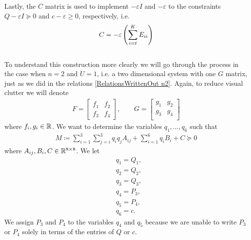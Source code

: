 \documentclass[a4paper,12pt,twoside,BCOR=10mm]{scrbook}
\begin{document}
Lastly, the $C$ matrix is used to implement $-\varepsilon I$ and $-\varepsilon$ to the constraints $Q - \varepsilon I \succeq 0$ and $c - \varepsilon \geq 0$, respectively, i.e.
\begin{align*}
    C = -\varepsilon\left(\sum_{i = t}^K E_{ii}\right)
\end{align*}
\\
To understand this construction more clearly we will go through the process in the case when $n = 2$ and $U = 1$, i.e. a two dimensional system with one $G$ matrix, just as we did in the relations \eqref{RelationsWrittenOut n2}. Again, to reduce visual clutter we will denote
\begin{align*}
    F = \begin{bmatrix}
    f_1 & f_2\\
    f_3 & f_4
    \end{bmatrix}
    , \qquad
    G = \begin{bmatrix}
    g_1 & g_2\\
    g_3 & g_4\\
    \end{bmatrix}
\end{align*}
where $f_i,g_i \in \mathbb{R}^{}$. We want to determine the variables $q_1, \ldots, q_6$ such that
\begin{align}
    M \coloneqq \sum_{i = 1}^3\sum_{j = i}^3 q_i q_j A_{ij} + \sum_{i = 1}^6 q_i B_i + C \succeq 0
\end{align}
where $A_{ij}, B_i, C \in \mathbb{R}^{8\times 8}$. We let
\begin{align*}
    &q_1 = Q_1,\\
    &q_2 = Q_2,\\
    &q_3 = Q_3,\\
    &q_4 = P_3,\\
    &q_5 = P_4,\\
    &q_6 = c.
\end{align*}
We assign $P_3$ and $P_4$ to the variables $q_4$ and $q_5$ because we are unable to write $P_3$ or $P_4$ solely in terms of the entries of $Q$ or $c$.
\end{document}
